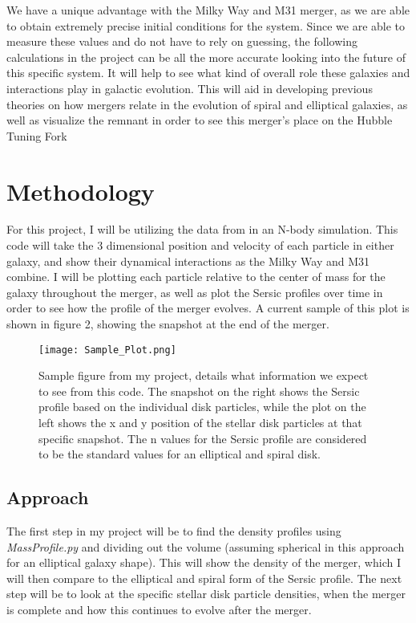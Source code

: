 \documentclass[twocolumn]{aastex63}
\begin{document}
\medskip
We have a unique advantage with the Milky Way and M31 merger, as we are able to obtain extremely precise initial conditions for the system. Since we are able to measure these values and do not have to rely on guessing, the following calculations in the project can be all the more accurate looking into the future of this specific system. It will help to see what kind of overall role these galaxies and interactions play in galactic evolution. This will aid in developing previous theories on how mergers relate in the evolution of spiral and elliptical galaxies, as well as visualize the remnant in order to see this merger's place on the Hubble Tuning Fork



\section{Methodology}

For this project, I will be utilizing the data from \cite{2012ApJ...753....9V} in an N-body simulation. This code will take the 3 dimensional position and velocity of each particle in either galaxy, and show their dynamical interactions as the Milky Way and M31 combine. I will be plotting each particle relative to the center of mass for the galaxy throughout the merger, as well as plot the Sersic profiles over time in order to see how the profile of the merger evolves. A current sample of this plot is shown in figure 2, showing the snapshot at the end of the merger.

\begin{figure}[h]
     \centering
     \texttt{[image: Sample\_Plot.png]}
     \caption{Sample figure from my project, details what information we expect to see from this code. The snapshot on the right shows the Sersic profile based on the individual disk particles, while the plot on the left shows the x and y position of the stellar disk particles at that specific snapshot. The n values for the Sersic profile are considered to be the standard values for an elliptical and spiral disk.}
     \label{fig:figure2}
\end{figure}

\subsection{Approach}
The first step in my project will be to find the density profiles using \textit{MassProfile.py} and dividing out the volume (assuming spherical in this approach for an elliptical galaxy shape). This will show the density of the merger, which I will then compare to the elliptical and spiral form of the Sersic profile. The next step will be to look at the specific stellar disk particle densities, when the merger is complete and how this continues to evolve after the merger. 
\end{document}
